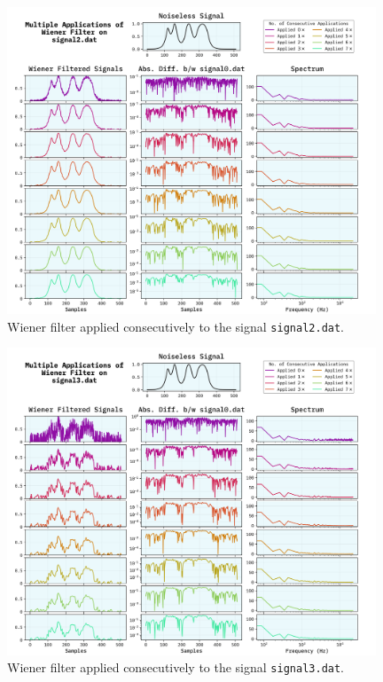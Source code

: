 \documentclass[10pt, titlepage, a4paper]{article}
\begin{document}
\begin{figure}[H]
    \centering
    \includegraphics[width=0.98\textwidth]{../WienerFilter/Images/multiple-signal2.dat.png}
    \caption{Wiener filter applied consecutively to the signal \texttt{signal2.dat}.}
    \label{fig:wiener-filter-2-2}
\end{figure}

\begin{figure}[H]
    \centering
    \includegraphics[width=0.98\textwidth]{../WienerFilter/Images/multiple-signal3.dat.png}
    \caption{Wiener filter applied consecutively to the signal \texttt{signal3.dat}.}
    \label{fig:wiener-filter-3-2}
\end{figure}
\end{document}
